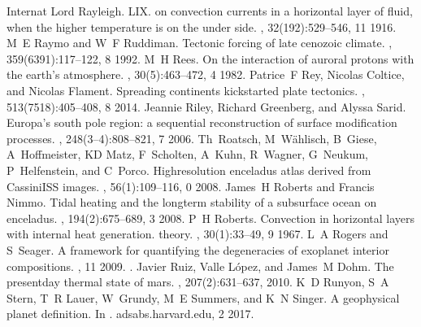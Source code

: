 \documentclass[letterpaper,10pt,english]{jupyterBook}
\begin{document}
\begin{sphinxthebibliography}{Internat}
\sphinxAtStartPar
Lord Rayleigh. LIX. on convection currents in a horizontal layer of fluid, when the higher temperature is on the under side. , 32(192):529–546, 11 1916.
\sphinxAtStartPar
M E Raymo and W F Ruddiman. Tectonic forcing of late cenozoic climate. , 359(6391):117–122, 8 1992.
\sphinxAtStartPar
M H Rees. On the interaction of auroral protons with the earth's atmosphere. , 30(5):463–472, 4 1982.
\sphinxAtStartPar
Patrice F Rey, Nicolas Coltice, and Nicolas Flament. Spreading continents kick\sphinxhyphen{}started plate tectonics. , 513(7518):405–408, 8 2014.
\sphinxAtStartPar
Jeannie Riley, Richard Greenberg, and Alyssa Sarid. Europa's south pole region: a sequential reconstruction of surface modification processes. , 248(3–4):808–821, 7 2006.
\sphinxAtStartPar
Th Roatsch, M Wählisch, B Giese, A Hoffmeister, K\sphinxhyphen{}D Matz, F Scholten, A Kuhn, R Wagner, G Neukum, P Helfenstein, and C Porco. High\sphinxhyphen{}resolution enceladus atlas derived from Cassini\sphinxhyphen{}ISS images. , 56(1):109–116, 0 2008.
\sphinxAtStartPar
James H Roberts and Francis Nimmo. Tidal heating and the long\sphinxhyphen{}term stability of a subsurface ocean on enceladus. , 194(2):675–689, 3 2008.
\sphinxAtStartPar
P H Roberts. Convection in horizontal layers with internal heat generation. theory. , 30(1):33–49, 9 1967.
\sphinxAtStartPar
L A Rogers and S Seager. A framework for quantifying the degeneracies of exoplanet interior compositions. , 11 2009. .
\sphinxAtStartPar
Javier Ruiz, Valle López, and James M Dohm. The present\sphinxhyphen{}day thermal state of mars. , 207(2):631–637, 2010.
\sphinxAtStartPar
K D Runyon, S A Stern, T R Lauer, W Grundy, M E Summers, and K N Singer. A geophysical planet definition. In . adsabs.harvard.edu, 2 2017.

\end{sphinxthebibliography}
\end{document}
